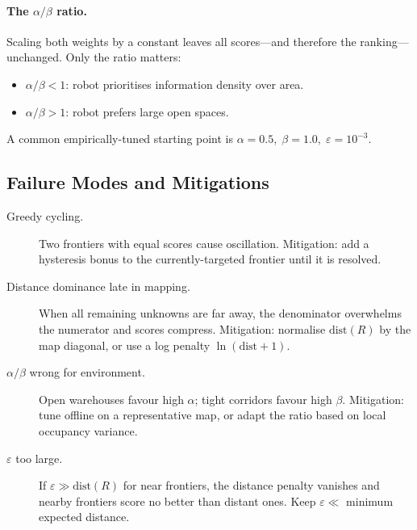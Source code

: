 \documentclass[12pt,a4paper]{article}
\begin{document}
\paragraph{The $\alpha/\beta$ ratio.}
Scaling both weights by a constant leaves all scores—and therefore the
ranking—unchanged. Only the ratio matters:
\begin{itemize}
  \item $\alpha/\beta < 1$: robot prioritises information density over area.
  \item $\alpha/\beta > 1$: robot prefers large open spaces.
\end{itemize}
A common empirically-tuned starting point is
$\alpha = 0.5,\;\beta = 1.0,\;\varepsilon = 10^{-3}$.

\subsection{Failure Modes and Mitigations}

\begin{description}
  \item[Greedy cycling.]
        Two frontiers with equal scores cause oscillation. Mitigation: add a
        hysteresis bonus to the currently-targeted frontier until it is
        resolved.

  \item[Distance dominance late in mapping.]
        When all remaining unknowns are far away, the denominator overwhelms
        the numerator and scores compress. Mitigation: normalise
        $\text{dist}(R)$ by the map diagonal, or use a log penalty
        $\ln(\text{dist}+1)$.

  \item[$\alpha/\beta$ wrong for environment.]
        Open warehouses favour high $\alpha$; tight corridors favour high
        $\beta$. Mitigation: tune offline on a representative map, or adapt
        the ratio based on local occupancy variance.

  \item[$\varepsilon$ too large.]
        If $\varepsilon \gg \text{dist}(R)$ for near frontiers, the distance
        penalty vanishes and nearby frontiers score no better than distant
        ones. Keep $\varepsilon \ll$ minimum expected distance.
\end{description}

\newpage
\end{document}
